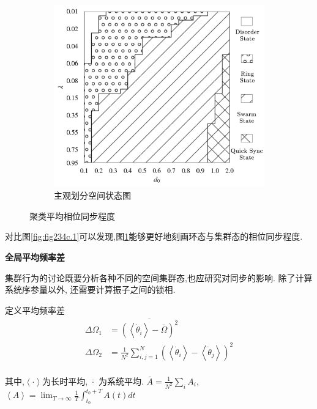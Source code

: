 \documentclass{article}
\begin{document}
\begin{figure}[H]
\begin{subfigure}[b]{0.49\textwidth}
		\includegraphics[width=\textwidth]{./figs/subjectiveOp3.png}
		\vspace{-1cm}
		\caption{主观划分空间状态图}
	\end{subfigure}
	\vspace{-0.5cm}
	\caption{聚类平均相位同步程度}
	\label{fig:fig234c.5}
\end{figure}

\vspace{-0.5cm}
对比图\ref{fig:fig234c.1}可以发现,图\ref{fig:fig234c.5}能够更好地刻画环态与集群态的相位同步程度. 

\noindent\textbf{全局平均频率差}

集群行为的讨论既要分析各种不同的空间集群态,也应研究对同步的影响. 除了计算系统序参量以外, 还需要计算振子之间的锁相.

定义平均频率差
$$
\begin{aligned}
	\Delta \Omega _1&=\overline{\left( \left< \dot{\theta}_i \right> -\bar{\Omega} \right) ^2}\\
	\Delta \Omega _2&=\frac{1}{N^2}\sum_{i,j=1}^N{\left( \left< \dot{\theta}_i \right> -\left< \dot{\theta}_j \right> \right) ^2}\\
\end{aligned}
$$

其中,$\left< \cdot \right>$为长时平均,$\overline{\,\,\cdot \,\,}$为系统平均. $\bar{A}=\frac{1}{N^2}\sum\nolimits_i^{}{A_i}$, $\left< A \right> =\lim_{T\rightarrow \infty} \frac{1}{T}\int_{t_0}^{t_0+T}{A\left( t \right) dt}$
\end{document}
